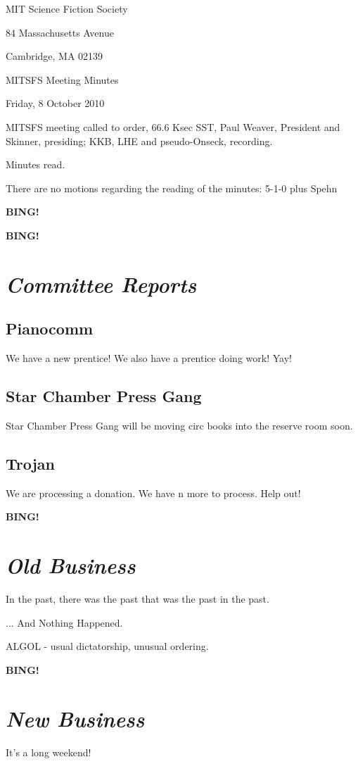 \documentclass[10pt]{article}
\newcommand{\bing}{{\bf BING!} }
\newcommand{\goto}[1]{\bing \vskip 12pt \section*{{\em{#1}}}}
\newcommand{\ps}{ plus Spehn\xspace}
\newcommand{\skinner}{Paul Weaver, President and Skinner}
\newcommand{\onseck}{KKB, LHE and pseudo-Onseck}
\newcommand{\meetingdate}{Friday, 8 October 2010}
\begin{document}
\begin{center}

MIT Science Fiction Society

84 Massachusetts Avenue

Cambridge, MA 02139

\vspace{12pt}

MITSFS Meeting Minutes

\meetingdate

\end{center}

\vspace{18pt}

\setlength{\parskip}{6pt}

\noindent
MITSFS meeting called to order, 66.6 Ksec SST,
\skinner, presiding; \onseck, recording.

Minutes read.

There are no motions regarding the reading of the minutes: 5-1-0 \ps

\bing

\goto{Committee Reports}

\subsection*{Pianocomm}

We have a new prentice!  We also have a prentice doing work!  Yay!

\subsection*{Star Chamber Press Gang}

Star Chamber Press Gang will be moving circ books into the reserve room soon.

\subsection*{Trojan}

We are processing a donation.  We have n more to process.  Help out!

\goto{Old Business}

In the past, there was the past that was the past in the past.

... And Nothing Happened.

ALGOL - usual dictatorship, unusual ordering.

\goto{New Business}

It's a long weekend!
\end{document}
